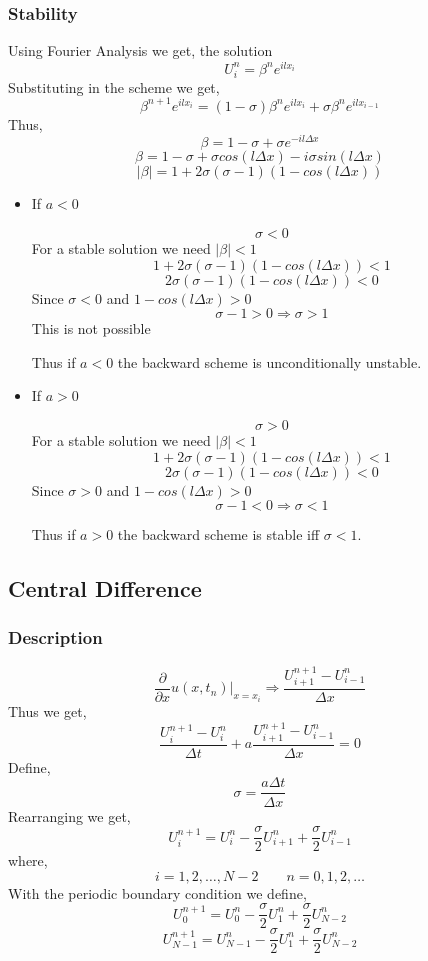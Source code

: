 \documentclass[11pt]{article}
\begin{document}
\subsubsection{Stability}
\label{sec:org09fdb0e}

Using Fourier Analysis we get, the solution
$$U_i^n = \beta^n e^{i l x_i}$$
Substituting in the scheme we get,
$$\beta^{n+1} e^{i l x_i} = \left( 1 - \sigma \right) \beta^n e^{i l x_i} + \sigma \beta^n e^{i l x_{i-1}}$$
Thus,
$$\beta = 1 - \sigma + \sigma e^{- i l \Delta x}$$
$$\beta = 1 - \sigma + \sigma cos(l \Delta x) - i \sigma sin(l \Delta x)$$
$$\lvert \beta \rvert = 1 + 2 \sigma \left( \sigma -1 \right) \left( 1 - cos(l \Delta x) \right)$$

\begin{itemize}
\item If \(a<0\)

$$\sigma < 0$$
For a stable solution we need \(\lvert \beta \rvert < 1\)
$$1 + 2 \sigma \left( \sigma -1 \right) \left( 1 - cos(l \Delta x) \right) <1$$
$$2 \sigma \left( \sigma -1 \right) \left( 1 - cos(l \Delta x) \right) <0$$
Since \(\sigma <0\) and \(1 - cos(l \Delta x) > 0\)
$$\sigma - 1 > 0 \Rightarrow \sigma > 1$$
This is not possible

Thus if \(a<0\) the backward scheme is unconditionally unstable.

\item If \(a>0\)

$$\sigma > 0$$
For a stable solution we need \(\lvert \beta \rvert < 1\)
$$1 + 2 \sigma \left( \sigma -1 \right) \left( 1 - cos(l \Delta x) \right) <1$$
$$2 \sigma \left( \sigma -1 \right) \left( 1 - cos(l \Delta x) \right) <0$$
Since \(\sigma >0\) and \(1 - cos(l \Delta x) > 0\)
$$\sigma -1 < 0 \Rightarrow \sigma < 1$$

Thus if \(a>0\) the backward scheme is stable iff \(\sigma < 1\).
\end{itemize}
\subsection{Central Difference}
\label{sec:orgb1047b1}
\subsubsection{Description}
\label{sec:orge42c561}
$$\frac{\partial}{\partial x} u(x,t_n) \bigg|_{x=x_i} \Rightarrow \frac{U_{i+1}^{n+1} - U_{i-1}^n}{\Delta x}$$
Thus we get,
$$\frac{U_i^{n+1} - U_i^n}{\Delta t} + a \frac{U_{i+1}^{n+1} - U_{i-1}^n}{\Delta x} = 0$$
Define,
$$\sigma = \frac{a \Delta t}{\Delta x}$$
Rearranging we get,
$$U_i^{n+1} = U_i^n - \frac{\sigma}{2} U_{i+1}^n + \frac{\sigma}{2} U_{i-1}^n$$
where,
$$i=1,2,\ldots,N-2 \qquad n = 0,1,2,\ldots$$
With the periodic boundary condition we define,
$$U_0^{n+1} = U_0^n - \frac{\sigma}{2} U_{1}^n + \frac{\sigma}{2} U_{N-2}^n$$
$$U_{N-1}^{n+1} = U_{N-1}^n - \frac{\sigma}{2} U_{1}^n + \frac{\sigma}{2} U_{N-2}^n$$
\end{document}
